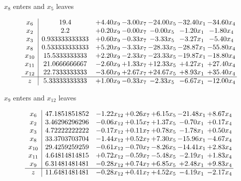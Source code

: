 \documentclass[8pt]{article}
\begin{document}
 $ x_{8} $ enters and $ x_{5} $ leaves 

 \[\begin{array}{c| c c@{\hskip 2pt} c@{\hskip 2pt} c@{\hskip 2pt} c@{\hskip 2pt} c@{\hskip 2pt} }
 x_{6}   &  19.4 & +  4.40 x_{9} & -3.00 x_{7} & -24.00 x_{5} & -32.40 x_{1} & -34.60 x_{4}\\
 x_{2}   &  2.2 & +  0.20 x_{9} & -0.00 x_{7} & -0.00 x_{5} & -1.20 x_{1} & -1.80 x_{4}\\
 x_{3}   &  0.933333333333 & +  0.60 x_{9} & -0.33 x_{7} & -3.33 x_{5} & -3.27 x_{1} & -5.40 x_{4}\\
 x_{8}   &  0.533333333333 & +  5.20 x_{9} & -3.33 x_{7} & -28.33 x_{5} & -28.87 x_{1} & -55.80 x_{4}\\
 x_{10}   &  15.5333333333 & +  2.20 x_{9} & -2.33 x_{7} & -23.33 x_{5} & -19.87 x_{1} & -18.80 x_{4}\\
 x_{11}   &  21.0666666667 & -2.60 x_{9} & +  1.33 x_{7} & + 12.33 x_{5} & +  4.27 x_{1} & + 27.40 x_{4}\\
 x_{12}   &  22.7333333333 & -3.60 x_{9} & +  2.67 x_{7} & + 24.67 x_{5} & +  8.93 x_{1} & + 35.40 x_{4}\\
\hline
z    &  5.33333333333 & +  1.00 x_{9} & -0.33 x_{7} & -2.33 x_{5} & -6.67 x_{1} & -12.00 x_{4}\\
\end{array}\]


 $ x_{9} $ enters and $ x_{12} $ leaves 

 \[\begin{array}{c| c c@{\hskip 2pt} c@{\hskip 2pt} c@{\hskip 2pt} c@{\hskip 2pt} c@{\hskip 2pt} }
 x_{6}   &  47.1851851852 & -1.22 x_{12} & +  0.26 x_{7} & +  6.15 x_{5} & -21.48 x_{1} & +  8.67 x_{4}\\
 x_{2}   &  3.46296296296 & -0.06 x_{12} & +  0.15 x_{7} & +  1.37 x_{5} & -0.70 x_{1} & +  0.17 x_{4}\\
 x_{3}   &  4.72222222222 & -0.17 x_{12} & +  0.11 x_{7} & +  0.78 x_{5} & -1.78 x_{1} & +  0.50 x_{4}\\
 x_{8}   &  33.3703703704 & -1.44 x_{12} & +  0.52 x_{7} & +  7.30 x_{5} & -15.96 x_{1} & -4.67 x_{4}\\
 x_{10}   &  29.4259259259 & -0.61 x_{12} & -0.70 x_{7} & -8.26 x_{5} & -14.41 x_{1} & +  2.83 x_{4}\\
 x_{11}   &  4.64814814815 & +  0.72 x_{12} & -0.59 x_{7} & -5.48 x_{5} & -2.19 x_{1} & +  1.83 x_{4}\\
 x_{9}   &  6.31481481481 & -0.28 x_{12} & +  0.74 x_{7} & +  6.85 x_{5} & +  2.48 x_{1} & +  9.83 x_{4}\\
\hline
z    &  11.6481481481 & -0.28 x_{12} & +  0.41 x_{7} & +  4.52 x_{5} & -4.19 x_{1} & -2.17 x_{4}\\
\end{array}\]
\end{document}
